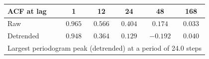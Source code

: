 \begin{tabular}{lccccc}
\toprule
\textbf{ACF at lag} & 1 & 12 & 24 & 48 & 168 \\
\midrule
Raw & $0.965$ & $0.566$ & $0.404$ & $0.174$ & $0.033$ \\
Detrended & $0.948$ & $0.364$ & $0.129$ & $-0.192$ & $0.040$ \\
\midrule
\multicolumn{6}{l}{Largest periodogram peak (detrended) at a period of 24.0 steps} \\
\bottomrule
\end{tabular}
